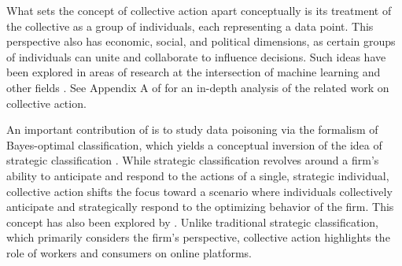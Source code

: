 What sets the concept of collective action apart conceptually is its treatment of the collective as a group of individuals, each representing a data point. This perspective also has economic, social, and political dimensions, as certain groups of individuals can unite and collaborate to influence decisions. Such ideas have been explored in areas of research at the intersection of machine learning and other fields \cite{vincent2019strikes, albert2020politicsadversarialmachinelearning, vincent2021dataleverage, albert2021adversarialgoodadversarialml, creager2023online,  vincent2021datacontribution}. See Appendix A of \citet{hardt2023collectiveaction} for an in-depth analysis of the related work on collective action.

An important contribution of \citet{hardt2023collectiveaction} is to study data poisoning via the formalism of Bayes-optimal classification, which yields a conceptual inversion of the idea of strategic classification \cite{hardt2016strategicclassification}. While strategic classification revolves around a firm's ability to anticipate and respond to the actions of a single, strategic individual, collective action shifts the focus toward a scenario where individuals collectively anticipate and strategically respond to the optimizing behavior of the firm. This concept has also been explored by \citet{zrnic2021wholeads}. Unlike traditional strategic classification, which primarily considers the firm’s perspective, collective action highlights the role of workers and consumers on online platforms.